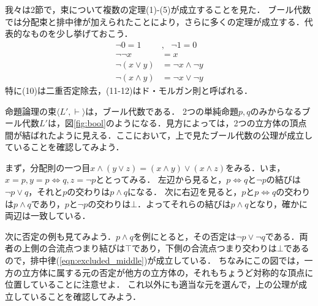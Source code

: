 \documentclass[11pt,a4paper, dvipdfmx]{jsarticle}
\begin{document}

我々は2節で，束について複数の定理(1)-(5)が成立することを見た．
ブール代数では分配束と排中律が加えられたことにより，さらに多くの定理が成立する．代表的なものを少し挙げておこう．
\begin{align}
\neg 0 = 1 &, \ \ \ \neg 1 = 0  \\
\neg \neg x &= x \\
\neg (x \vee y) &= \neg x \wedge \neg y \\
\neg (x \wedge y) &= \neg x \vee \neg y
\end{align}
特に(10)は二重否定除去，(11-12)はド・モルガン則と呼ばれる．
 
\begin{rei}{}{}
    命題論理の束$\langle L', \vdash \rangle$は，ブール代数である．
    2つの単純命題$p, q$のみからなるブール代数$L'$は，図\ref{fig:bool}のようになる．見方によっては，2つの立方体の頂点間が結ばれたように見える．ここにおいて，上で見たブール代数の公理が成立していることを確認してみよう．

    まず，分配則の一つ目$x \wedge (y \vee z) = (x \wedge y) \vee (x \wedge z) $をみる．いま，$x = p, y = p \iff q, z = \neg p$ととってみる．
    左辺から見ると，$p \iff q$と$\neg p$の結びは$\neg p \vee q$，それと$p$の交わりは$p \wedge q$になる．
    次に右辺を見ると，$p$と$p \iff q$の交わりは$p \wedge q$であり，$p$と$\neg p$の交わりは$\bot$．よってそれらの結びは$p \wedge q$となり，確かに両辺は一致している．
    
    次に否定の例も見てみよう．$p \wedge q$を例にとると，その否定は$\neg p \vee \neg q$である．両者の上側の合流点つまり結びは$\top$であり，下側の合流点つまり交わりは$\bot$であるので，排中律(\ref{eqn:excluded_middle})が成立している．
    ちなみにこの図では，一方の立方体に属する元の否定が他方の立方体の，それもちょうど対称的な頂点に位置していることに注意せよ．
    これ以外にも適当な元を選んで，上の公理が成立していることを確認してみよう．
\end{rei}
\end{document}

